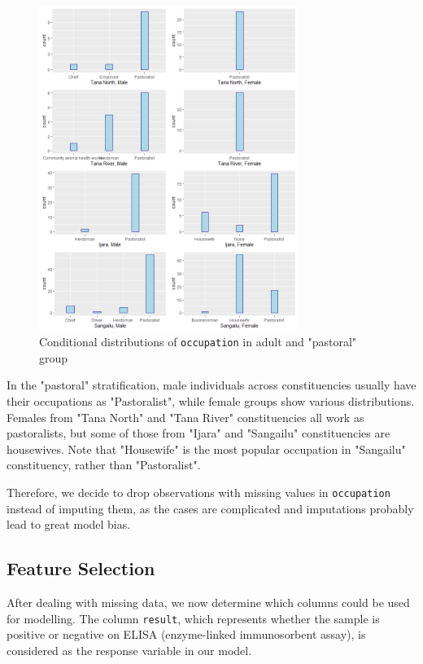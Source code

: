 \documentclass[11pt,twoside]{article}
\numberwithin{Theorem}{section}
\numberwithin{Definition}{section}
\numberwithin{Lemma}{section}
\numberwithin{Algorithm}{section}
\numberwithin{equation}{section}
\begin{document}
\begin{figure}[!h]
	\centering
	\includegraphics[width = 0.75\textwidth]{Images/occupation_gender_constituency.png}
	\caption{Conditional distributions of \texttt{occupation} in adult and "pastoral" group}
	\label{fig:occ4}		
\end{figure} 

In the "pastoral" stratification, male individuals across constituencies usually have their occupations as "Pastoralist", while female groups show various distributions. Females from "Tana North" and "Tana River" constituencies all work as pastoralists, but some of those from "Ijara" and "Sangailu" constituencies are housewives. Note that "Housewife" is the most popular occupation in "Sangailu" constituency, rather than "Pastoralist".

Therefore, we decide to drop observations with missing values in \texttt{occupation} instead of imputing them, as the cases are complicated and imputations probably lead to great model bias. 

\subsection{Feature Selection}

After dealing with missing data, we now determine which columns could be used for modelling. The column \texttt{result}, which represents whether the sample is positive or negative on ELISA (enzyme-linked immunosorbent assay), is considered as the response variable in our model. 
\end{document}
